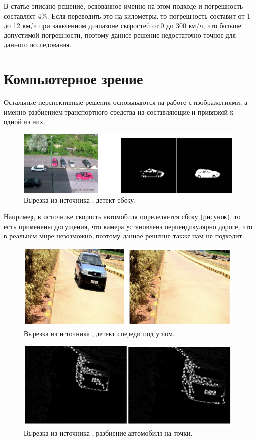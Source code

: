 \documentclass[specification,annotation,times]{itmo-student-thesis}
\begin{document}
В статье \cite{5228496}  описано решение, основанное именно на этом подходе и погрешность составляет 4\%. Если переводить это на километры, то погрешность составит от 1 до 12 км/ч при заявленном диапазоне скоростей от 0 до 300 км/ч, что больше допустимой погрешности, поэтому данное решение недостаточно точное для данного исследования.

\section{Компьютерное зрение}
Остальные перспективные решения \cite{Gawande20} основываются на работе с изображениями, а именно разбиением транспортного средства на составляющие и привязкой к одной из них.

\begin{figure}[!ht]
	\caption{Вырезка из источника \cite{8124468}, детект сбоку.}\label{img:side_car}
	\includegraphics[width=0.85\linewidth]{../png/side_car.png}
	\centering
\end{figure}

Например, в источнике \cite{8124468} скорость автомобиля определяется сбоку (рисунок), то есть применены допущения, что камера установлена перпендикулярно дороге, что в реальном мире невозможно, поэтому данное решение также нам не подходит.

\begin{figure}[!ht]
	\caption{Вырезка из источника \cite{6754885}, детект спереди под углом.}\label{img:corner1}
	\includegraphics[width=0.85\linewidth]{../png/corner1.png}
	\centering
\end{figure}

\begin{figure}[!ht]
	\caption{Вырезка из источника \cite{6754885}, разбиение автомобиля на точки.}\label{img:corner2}
	\includegraphics[width=0.85\linewidth]{../png/corner2.png}
	\centering
\end{figure}
\end{document}
